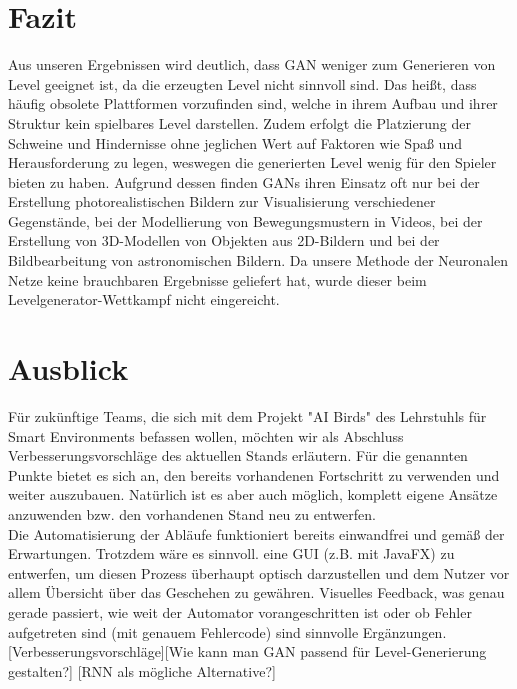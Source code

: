 \section{Fazit}
Aus unseren Ergebnissen wird deutlich, dass GAN weniger zum Generieren von Level geeignet ist, da die erzeugten Level nicht sinnvoll sind. Das heißt, dass häufig obsolete Plattformen vorzufinden sind, welche in ihrem Aufbau und ihrer Struktur kein spielbares Level darstellen. Zudem erfolgt die Platzierung der Schweine und Hindernisse ohne jeglichen Wert auf Faktoren wie Spaß und Herausforderung zu legen, weswegen die generierten Level wenig für den Spieler bieten zu haben. Aufgrund dessen finden GANs ihren Einsatz oft nur bei der Erstellung photorealistischen Bildern zur Visualisierung verschiedener Gegenstände, bei der Modellierung von Bewegungsmustern in Videos, bei der Erstellung von 3D-Modellen von Objekten aus 2D-Bildern und bei der  Bildbearbeitung von astronomischen Bildern. Da unsere Methode der Neuronalen Netze keine brauchbaren Ergebnisse geliefert hat, wurde dieser beim Levelgenerator-Wettkampf nicht eingereicht. 
\section{Ausblick}
Für zukünftige Teams, die sich mit dem Projekt "AI Birds" des Lehrstuhls für Smart Environments befassen wollen, möchten wir als Abschluss Verbesserungsvorschläge des aktuellen Stands erläutern. Für die genannten Punkte bietet es sich an, den bereits vorhandenen Fortschritt zu verwenden und weiter auszubauen. Natürlich ist es aber auch möglich, komplett eigene Ansätze anzuwenden bzw. den vorhandenen Stand neu zu entwerfen. \\ Die Automatisierung der Abläufe funktioniert bereits einwandfrei und gemäß der Erwartungen. Trotzdem wäre es sinnvoll. eine GUI (z.B. mit JavaFX) zu entwerfen, um diesen Prozess überhaupt optisch darzustellen und dem Nutzer vor allem Übersicht über das Geschehen zu gewähren. Visuelles Feedback, was genau gerade passiert, wie weit der Automator vorangeschritten ist oder ob Fehler aufgetreten sind (mit genauem Fehlercode) sind sinnvolle Ergänzungen.
[Verbesserungsvorschläge][Wie kann man GAN passend für Level-Generierung gestalten?] [RNN als mögliche Alternative?]
